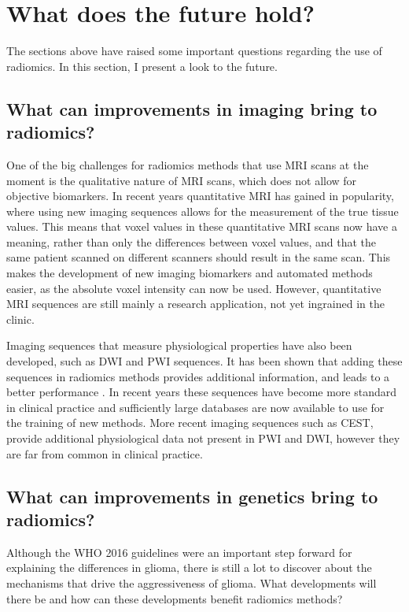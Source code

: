 \section{What does the future hold?}\label{sec:discussion_future}

The sections above have raised some important questions regarding the use of radiomics.
In this section, I present a look to the future.


\subsection{What can improvements in imaging bring to radiomics?}\label{sec:dicussion_new_imaging}

One of the big challenges for radiomics methods that use \gls{MRI} scans at the moment is the qualitative nature of \gls{MRI} scans, which does not allow for objective biomarkers.
In recent years quantitative \gls{MRI} has gained in popularity, where using new imaging sequences allows for the measurement of the true tissue values.
This means that voxel values in these quantitative \gls{MRI} scans now have a meaning, rather than only the differences between voxel values, and that the same patient scanned on different scanners should result in the same scan.
This makes the development of new imaging biomarkers and automated methods easier, as the absolute voxel intensity can now be used.
However, quantitative \gls{MRI} sequences are still mainly a research application, not yet ingrained in the clinic.

Imaging sequences that measure physiological properties have also been developed, such as \gls{DWI} and \gls{PWI} sequences.
It has been shown that adding these sequences in radiomics methods provides additional information, and leads to a better performance \autocite{park2020radiomicsdwi,kim2020radiomicsdwi}.
In recent years these sequences have become more standard in clinical practice and sufficiently large databases are now available to use for the training of new methods.
More recent imaging sequences such as \gls{CEST}, provide additional physiological data not present in \gls{PWI} and \gls{DWI}, however they are far from common in clinical practice.



\subsection{What can improvements in genetics bring to radiomics?}\label{sec:discussion_new_genetics}
Although the \gls{WHO} 2016 guidelines were an important step forward for explaining the differences in glioma, there is still a lot to discover about the mechanisms that drive the aggressiveness of glioma.
What developments will there be and how can these developments benefit radiomics methods?

